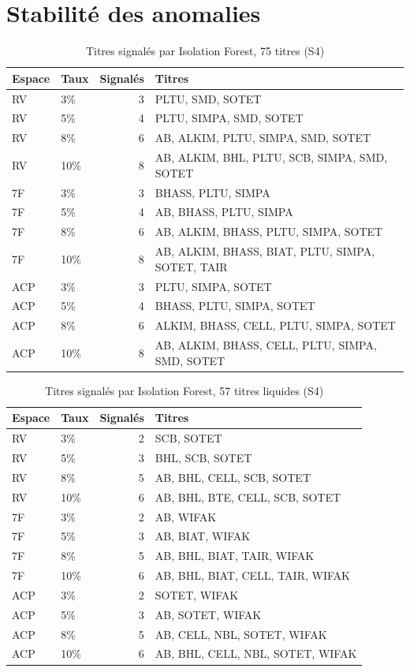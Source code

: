 \documentclass[11pt,a4paper]{article}
\begin{document}
\section{Stabilité des anomalies}\label{ann:stabilite}
\begin{table}[H]\centering\small
\caption{Titres signalés par Isolation Forest, 75 titres (S4)}\label{tab:annexe-if75}
\begin{tabular}{llrp{9cm}}\toprule
Espace & Taux & Signalés & Titres \\ \midrule
RV & 3\% & 3 & PLTU, SMD, SOTET \\
RV & 5\% & 4 & PLTU, SIMPA, SMD, SOTET \\
RV & 8\% & 6 & AB, ALKIM, PLTU, SIMPA, SMD, SOTET \\
RV & 10\% & 8 & AB, ALKIM, BHL, PLTU, SCB, SIMPA, SMD, SOTET \\
7F & 3\% & 3 & BHASS, PLTU, SIMPA \\
7F & 5\% & 4 & AB, BHASS, PLTU, SIMPA \\
7F & 8\% & 6 & AB, ALKIM, BHASS, PLTU, SIMPA, SOTET \\
7F & 10\% & 8 & AB, ALKIM, BHASS, BIAT, PLTU, SIMPA, SOTET, TAIR \\
ACP & 3\% & 3 & PLTU, SIMPA, SOTET \\
ACP & 5\% & 4 & BHASS, PLTU, SIMPA, SOTET \\
ACP & 8\% & 6 & ALKIM, BHASS, CELL, PLTU, SIMPA, SOTET \\
ACP & 10\% & 8 & AB, ALKIM, BHASS, CELL, PLTU, SIMPA, SMD, SOTET \\
\bottomrule\end{tabular}\end{table}
\begin{table}[H]\centering\small
\caption{Titres signalés par Isolation Forest, 57 titres liquides (S4)}\label{tab:annexe-if57}
\begin{tabular}{llrp{9cm}}\toprule
Espace & Taux & Signalés & Titres \\ \midrule
RV & 3\% & 2 & SCB, SOTET \\
RV & 5\% & 3 & BHL, SCB, SOTET \\
RV & 8\% & 5 & AB, BHL, CELL, SCB, SOTET \\
RV & 10\% & 6 & AB, BHL, BTE, CELL, SCB, SOTET \\
7F & 3\% & 2 & AB, WIFAK \\
7F & 5\% & 3 & AB, BIAT, WIFAK \\
7F & 8\% & 5 & AB, BHL, BIAT, TAIR, WIFAK \\
7F & 10\% & 6 & AB, BHL, BIAT, CELL, TAIR, WIFAK \\
ACP & 3\% & 2 & SOTET, WIFAK \\
ACP & 5\% & 3 & AB, SOTET, WIFAK \\
ACP & 8\% & 5 & AB, CELL, NBL, SOTET, WIFAK \\
ACP & 10\% & 6 & AB, BHL, CELL, NBL, SOTET, WIFAK \\
\bottomrule\end{tabular}\end{table}
\end{document}
